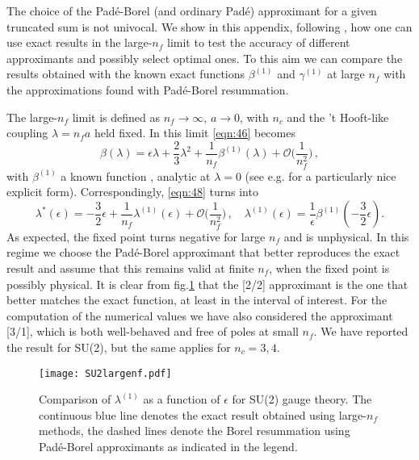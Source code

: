 \documentclass [11pt]{article}
\begin{document}
The choice of the Pad\'e-Borel (and ordinary Pad\'e) approximant for a given truncated sum is not univocal.
 We show in this appendix, following \cite{DiPietro:2020jne}, how one can use exact results in the large-$n_f$ limit to test the accuracy of different approximants and possibly select optimal ones.  
To this aim  we can compare the results obtained with the known exact functions $\beta^{(1)}$ and $\gamma^{(1)}$ at large $n_f$ with the approximations found with Pad\'e-Borel resummation. 


The large-$n_f$ limit is defined as $n_f\rightarrow \infty$, $a\rightarrow 0$, with $n_c$ and the 't Hooft-like coupling $\lambda = n_f a$ held fixed. In this limit \eqref{eqn:46} becomes
\begin{equation}
\beta(\lambda)=\epsilon\lambda+\frac{2}{3}\lambda^2+\frac{1}{n_f}\beta^{(1)}(\lambda)+\mathcal{O}\biggl(\frac{1}{n_f^2}\biggr)\,,
\label{eqn:50b}
\end{equation}
with $\beta^{(1)}$ a known function \cite{Gracey:1996he}, analytic at $\lambda = 0$ (see e.g. \cite{Holdom:2010qs} for a particularly nice explicit form).
Correspondingly, \eqref{eqn:48} turns into
\begin{equation}
\lambda^*(\epsilon)=-\frac{3}{2}\epsilon+\frac{1}{n_f}\lambda^{(1)}(\epsilon)+\mathcal{O}\biggl(\frac{1}{n_f^2}\biggr)\,, \quad \lambda^{(1)}(\epsilon) = \frac{1}{\epsilon}\beta^{(1)}\left(-\frac{3}{2}\epsilon\right).
\label{eqn:50}
\end{equation}
As expected, the fixed point turns negative for large $n_f$ and is unphysical. 
 In this regime we choose the Pad\'e-Borel approximant that better reproduces the exact result and assume that this
 remains valid at finite $n_f$, when the fixed point is possibly physical. It is clear from fig.\ref{fig:largenf} that the [2/2] approximant is the one that better matches the exact function, at least in the interval of interest. For the computation of the numerical values we have also considered the approximant [3/1], which is both well-behaved and free of poles at small $n_f$. We have reported the result for SU(2), but the same applies for $n_c=3,4$.
 \begin{figure}[t!]
 \centering
 \texttt{[image: SU2largenf.pdf]} 
\caption{Comparison of $\lambda^{(1)}$ as a function of $\epsilon$  for SU(2) gauge theory. 
 The continuous blue line denotes the exact result obtained using large-$n_f$ methods, the dashed lines denote the Borel resummation using Pad\'e-Borel approximants as indicated in the legend.}
 \label{fig:largenf} 
 \end{figure}
 
\end{document}

